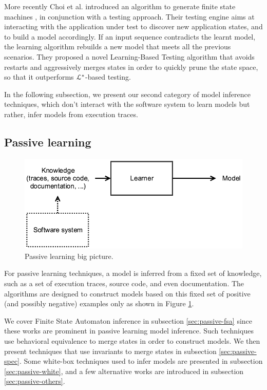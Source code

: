 More recently Choi et al. introduced an algorithm to generate
finite state machines \cite{Choi2013}, in conjunction with a
testing approach.  Their testing engine aims at interacting with
the application under test to discover new application states,
and to build a model accordingly. If an input sequence
contradicts the learnt model, the learning algorithm rebuilds a
new model that meets all the previous scenarios. They proposed a
novel Learning-Based Testing algorithm that avoids restarts and
aggressively merges states in order to quickly prune the state
space, so that it outperforms $\EuScript{L}^*$-based testing.

In the following subsection, we present our second category of model
inference techniques, which don't interact with the software
system to learn models but rather, infer models from execution
traces.


\subsection{Passive learning}
\label{sec:passive}

\begin{figure}[h]
    \begin{center}
        \includegraphics[width=0.9\linewidth]{figures/passive.png}
    \end{center}

    \caption{Passive learning big picture.}
    \label{fig:passive}
\end{figure}

For passive learning techniques, a model is inferred from a fixed
set of knowledge, such as a set of execution traces, source code,
and even documentation. The algorithms are designed to construct
models based on this fixed set of positive (and possibly
negative) examples only as shown in Figure \ref{fig:passive}.

We cover Finite State Automaton inference in subsection
\ref{sec:passive-fsa} since these works are prominent in passive
learning model inference. Such techniques use behavioral
equivalence to merge states in order to construct models.
We then present techniques that use invariants to merge states in
subsection \ref{sec:passive-spec}. Some white-box techniques used to
infer models are presented in subsection \ref{sec:passive-white},
and a few alternative works are introduced in subsection
\ref{sec:passive-others}.

